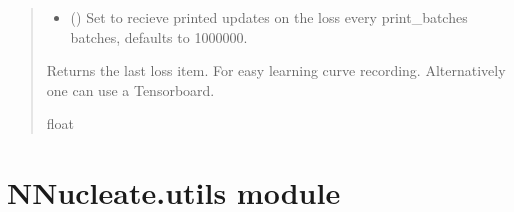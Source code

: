 \documentclass[a4paper,10pt,english]{report}
\begin{document}
\begin{fulllineitems}
\begin{quote}
\begin{description}
\begin{itemize}
\item {} 
\sphinxAtStartPar
{} (\sphinxstyleliteralemphasis{\sphinxupquote{, }}) \textendash{} Set to recieve printed updates on the loss every print\_batches batches, defaults to 1000000.

\end{itemize}

\sphinxAtStartPar
Returns the last loss item. For easy learning curve recording. Alternatively one can use a Tensorboard.

\sphinxAtStartPar
float

\end{description}\end{quote}

\end{fulllineitems}



\chapter{NNucleate.utils module}
\label{\detokenize{NNucleate:module-NNucleate.utils}}\label{\detokenize{NNucleate:nnucleate-utils-module}}
\end{document}
